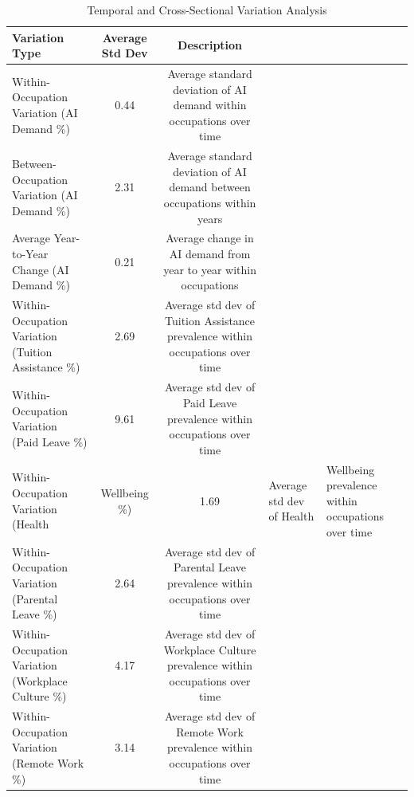 \begin{table}[htbp]
\caption{Temporal and Cross-Sectional Variation Analysis}
\label{tab:temporal_variation}
\begin{tabular}{lcc}
\hline\hline
Variation Type & Average Std Dev & Description \\
\hline
Within-Occupation Variation (AI Demand \%) & 0.44 & Average standard deviation of AI demand within occupations over time \\
Between-Occupation Variation (AI Demand \%) & 2.31 & Average standard deviation of AI demand between occupations within years \\
Average Year-to-Year Change (AI Demand \%) & 0.21 & Average change in AI demand from year to year within occupations \\
Within-Occupation Variation (Tuition Assistance \%) & 2.69 & Average std dev of Tuition Assistance prevalence within occupations over time \\
Within-Occupation Variation (Paid Leave \%) & 9.61 & Average std dev of Paid Leave prevalence within occupations over time \\
Within-Occupation Variation (Health & Wellbeing \%) & 1.69 & Average std dev of Health & Wellbeing prevalence within occupations over time \\
Within-Occupation Variation (Parental Leave \%) & 2.64 & Average std dev of Parental Leave prevalence within occupations over time \\
Within-Occupation Variation (Workplace Culture \%) & 4.17 & Average std dev of Workplace Culture prevalence within occupations over time \\
Within-Occupation Variation (Remote Work \%) & 3.14 & Average std dev of Remote Work prevalence within occupations over time \\
\hline\hline
\end{tabular}
\end{table}
